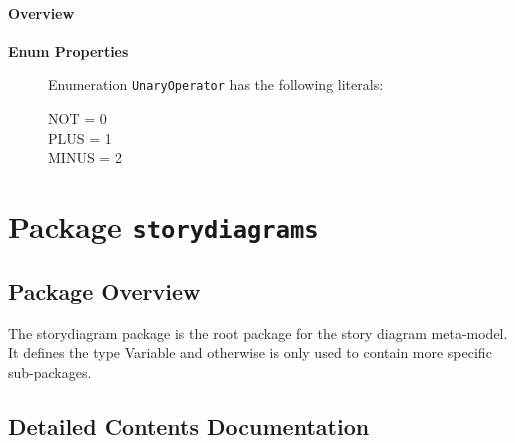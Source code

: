 \paragraph{Overview}
	


\begin{description}

	\item[\textbf{Enum Properties}] Enumeration \texttt{UnaryOperator} has the following literals:

	\begin{description}
		
		\item[NOT = 0]
		\hspace{\fill}
		\nopagebreak

		\item[PLUS = 1]
		\hspace{\fill}
		\nopagebreak

		\item[MINUS = 2]
		\hspace{\fill}
		\nopagebreak
 
	\end{description}

\end{description}



\newpage
		




\section{Package \bfseries \texttt{storydiagrams}\normalfont}
\subsection{Package Overview}
	
			
The storydiagram package is the root package for the story diagram meta-model. It defines the type Variable and otherwise is only used to contain more specific sub-packages.	
		
	
			
		



\subsection{Detailed Contents Documentation}

